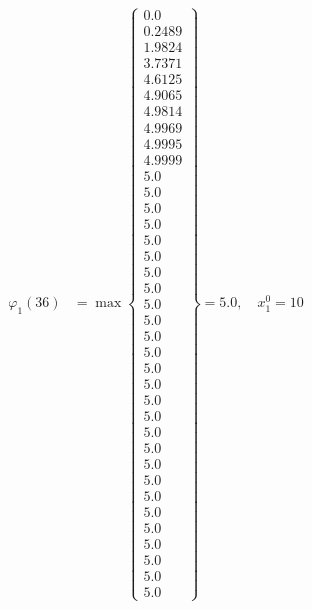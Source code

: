 \documentclass{article}
\begin{document}
\begin{align*}
\varphi_{1}(36) &= \max \left\{ \begin{array}{c}
0.0 \\
 0.2489 \\
 1.9824 \\
 3.7371 \\
 4.6125 \\
 4.9065 \\
 4.9814 \\
 4.9969 \\
 4.9995 \\
 4.9999 \\
 5.0 \\
 5.0 \\
 5.0 \\
 5.0 \\
 5.0 \\
 5.0 \\
 5.0 \\
 5.0 \\
 5.0 \\
 5.0 \\
 5.0 \\
 5.0 \\
 5.0 \\
 5.0 \\
 5.0 \\
 5.0 \\
 5.0 \\
 5.0 \\
 5.0 \\
 5.0 \\
 5.0 \\
 5.0 \\
 5.0 \\
 5.0 \\
 5.0 \\
 5.0 \\
 5.0
\end{array} \right\}=5.0, \quad x_{1}^0=10\\
  
 \\ 
\end{align*}
\end{document}
